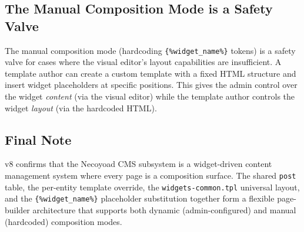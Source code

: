 \documentclass[11pt,a4paper]{article}
\begin{document}
\subsection{The Manual Composition Mode is a Safety Valve}

The manual composition mode (hardcoding \texttt{\{\%widget\_name\%\}}
tokens) is a safety valve for cases where the visual editor's layout
capabilities are insufficient. A template author can create a custom
template with a fixed HTML structure and insert widget placeholders at
specific positions. This gives the admin control over the widget
\emph{content} (via the visual editor) while the template author
controls the widget \emph{layout} (via the hardcoded HTML).

\subsection{Final Note}

v8 confirms that the Necoyoad CMS subsystem is a widget-driven content
management system where every page is a composition surface. The shared
\texttt{post} table, the per-entity template override, the
\texttt{widgets-common.tpl} universal layout, and the
\texttt{\{\%widget\_name\%\}} placeholder substitution together form a
flexible page-builder architecture that supports both dynamic
(admin-configured) and manual (hardcoded) composition modes.

\appendix
\end{document}
